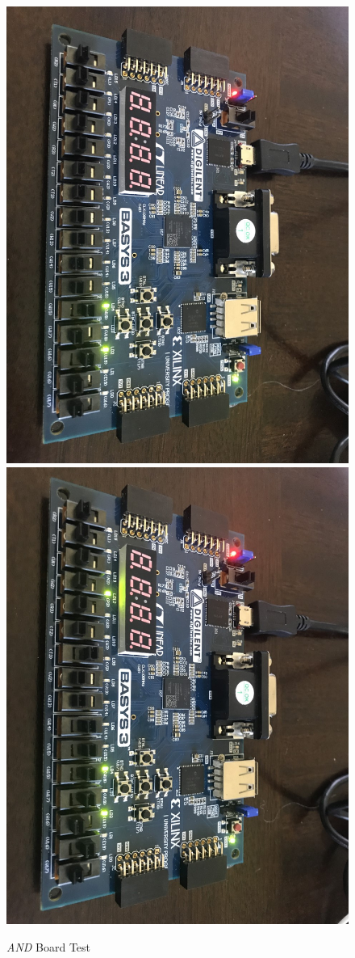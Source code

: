 \documentclass[11pt]{article}
\begin{document}
\begin{figure}[ht]\centering
	\includegraphics[angle=90, width=.8\textwidth]{and1}
	\includegraphics[angle=90, width=.8\textwidth]{and2}
	\caption{\textit{AND} Board Test}
	\label{fig:sim_with_table}
\end{figure}
\end{document}
